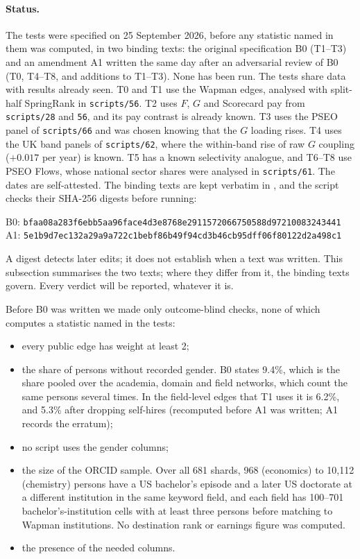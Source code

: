 \paragraph{Status.} The tests were specified on 25 September 2026, before any statistic named in them was
computed, in two binding texts: the original specification B0 (T1--T3) and an amendment A1 written the same day
after an adversarial review of B0 (T0, T4--T8, and additions to T1--T3). None has been run. The tests share data
with results already seen. T0 and T1 use the Wapman edges, analysed with split-half SpringRank in
\texttt{scripts/56}. T2 uses $F$, $G$ and Scorecard pay from \texttt{scripts/28} and \texttt{56}, and its pay
contrast is already known. T3 uses the PSEO panel of \texttt{scripts/66} and was chosen knowing that the $G$
loading rises. T4 uses the UK band panels of \texttt{scripts/62}, where the within-band rise of raw $G$ coupling
($+0.017$ per year) is known. T5 has a known selectivity analogue, and T6--T8 use PSEO Flows, whose national
sector shares were analysed in \texttt{scripts/61}. The dates are self-attested. The binding texts are kept
verbatim in \theoryprereg, and the script checks their SHA-256 digests before running:
\begin{center}\footnotesize
B0: \texttt{bfaa08a283f6ebb5aa96face4d3e8768e2911572066750588d97210083243441}\\
A1: \texttt{5e1b9d7ec132a29a9a722c1bebf86b49f94cd3b46cb95dff06f80122d2a498c1}
\end{center}
A digest detects later edits; it does not establish when a text was written. This subsection summarises the two
texts; where they differ from it, the binding texts govern. Every verdict will be reported, whatever it is.

Before B0 was written we made only outcome-blind checks, none of which computes a statistic named in the tests:
\begin{itemize}
\item every public edge has weight at least 2;
\item the share of persons without recorded gender. B0 states 9.4\%, which is the share pooled over the academia,
domain and field networks, which count the same persons several times. In the field-level edges that T1 uses it
is 6.2\%, and 5.3\% after dropping self-hires (recomputed before A1 was written; A1 records the erratum);
\item no script uses the gender columns;
\item the size of the ORCID sample. Over all 681 shards, 968 (economics) to 10{,}112 (chemistry) persons have a US
bachelor's episode and a later US doctorate at a different institution in the same keyword field, and each field
has 100--701 bachelor's-institution cells with at least three persons before matching to Wapman institutions. No
destination rank or earnings figure was computed.
\item the presence of the needed columns.
\end{itemize}

